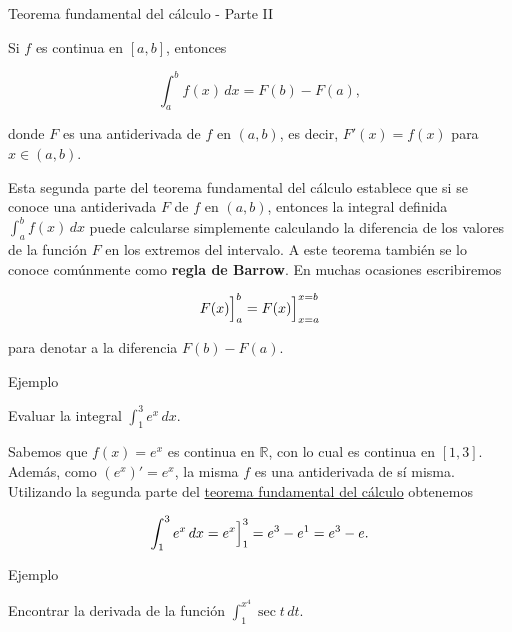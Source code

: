 \documentclass[
  letterpaper,
]{book}
\theoremstyle{plain}
\theoremstyle{remark}
\begin{document}
\label{teo-TFC2}
Teorema fundamental del cálculo - Parte II

Si \(f\) es continua en \([a,b]\), entonces

\[
\int_a^b f(x)\,dx=F(b)-F(a),
\]

donde \(F\) es una antiderivada de \(f\) en \((a,b)\), es decir,
\(F'(x)=f(x)\) para \(x\in (a,b)\).

Esta segunda parte del teorema fundamental del cálculo establece que si
se conoce una antiderivada \(F\) de \(f\) en \((a,b)\), entonces la
integral definida \(\displaystyle \int_a^b f(x)\,dx\) puede calcularse
simplemente calculando la diferencia de los valores de la función \(F\)
en los extremos del intervalo. A este teorema también se lo conoce
comúnmente como \textbf{regla de Barrow}. En muchas ocasiones
escribiremos

\[
F(x)\Big{]}_a^{b}=F(x)\Big{]}_{x=a}^{x=b}
\]

para denotar a la diferencia \(F(b)-F(a)\).

Ejemplo

Evaluar la integral \(\displaystyle \int_1^3 e^x\,dx\).

\begin{tcolorbox}[enhanced jigsaw, opacityback=0, left=2mm, opacitybacktitle=0.6, toprule=.15mm, bottomrule=.15mm, colbacktitle=quarto-callout-tip-color!10!white, titlerule=0mm, bottomtitle=1mm, title=\textcolor{quarto-callout-tip-color}{\faLightbulb}\hspace{0.5em}{Solución}, toptitle=1mm, colframe=quarto-callout-tip-color-frame, colback=white, breakable, rightrule=.15mm, arc=.35mm, leftrule=.75mm, coltitle=black]

Sabemos que \(f(x)=e^x\) es continua en \(\mathbb{R}\), con lo cual es
continua en \([1,3]\). Además, como \((e^x)'=e^x\), la misma \(f\) es
una antiderivada de sí misma. Utilizando la segunda parte del
\hyperref[teo-TFC2]{teorema fundamental del cálculo} obtenemos

\[
\int_1^3 e^x\,dx=e^x \Big{]}_{1}^{3} = e^3-e^1=e^3-e.
\]

\end{tcolorbox}

Ejemplo

Encontrar la derivada de la función
\(\displaystyle \int_1^{x^4} \sec t\,dt\).
\end{document}
